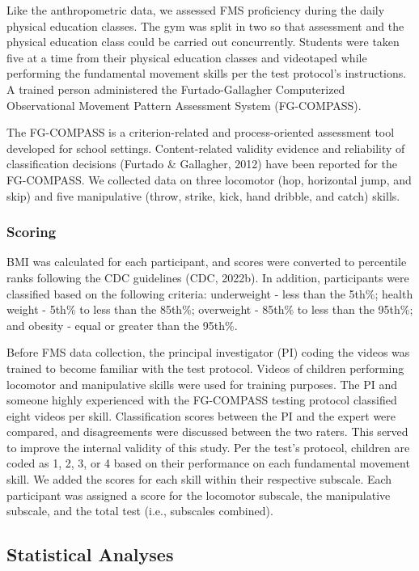 \documentclass[
  jou,
  colorlinks=true,linkcolor=blue,citecolor=blue,urlcolor=blue]{apa7}
\begin{document}
Like the anthropometric data, we assessed FMS proficiency during the
daily physical education classes. The gym was split in two so that
assessment and the physical education class could be carried out
concurrently. Students were taken five at a time from their physical
education classes and videotaped while performing the fundamental
movement skills per the test protocol's instructions. A trained person
administered the Furtado-Gallagher Computerized Observational Movement
Pattern Assessment System (FG-COMPASS).

The FG-COMPASS is a criterion-related and process-oriented assessment
tool developed for school settings. Content-related validity evidence
and reliability of classification decisions (Furtado \& Gallagher, 2012)
have been reported for the FG-COMPASS. We collected data on three
locomotor (hop, horizontal jump, and skip) and five manipulative (throw,
strike, kick, hand dribble, and catch) skills.

\hypertarget{scoring}{%
\subsubsection{Scoring}\label{scoring}}

BMI was calculated for each participant, and scores were converted to
percentile ranks following the CDC guidelines (CDC, 2022b). In addition,
participants were classified based on the following criteria:
underweight - less than the 5th\%; health weight - 5th\% to less than
the 85th\%; overweight - 85th\% to less than the 95th\%; and obesity -
equal or greater than the 95th\%.~~

Before FMS data collection, the principal investigator (PI) coding the
videos was trained to become familiar with the test protocol. Videos of
children performing locomotor and manipulative skills were used for
training purposes. The PI and someone highly experienced with the
FG-COMPASS testing protocol classified eight videos per skill.
Classification scores between the PI and the expert were compared, and
disagreements were discussed between the two raters. This served to
improve the internal validity of this study. Per the test's protocol,
children are coded as 1, 2, 3, or 4 based on their performance on each
fundamental movement skill. We added the scores for each skill within
their respective subscale. Each participant was assigned a score for the
locomotor subscale, the manipulative subscale, and the total test (i.e.,
subscales combined).

\hypertarget{statistical-analyses}{%
\subsection{Statistical Analyses}\label{statistical-analyses}}
\end{document}
